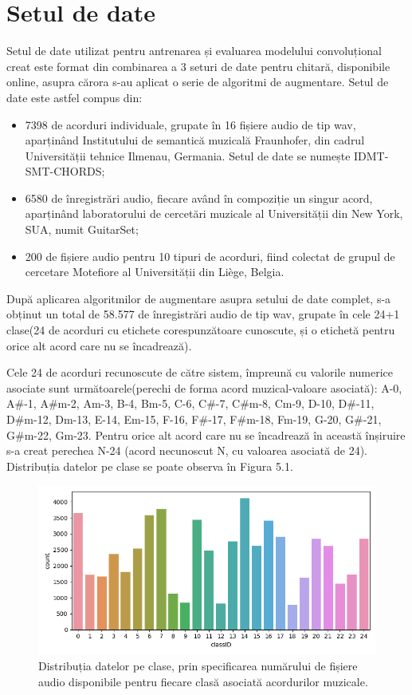 \documentclass[a4paper,12pt]{report}
\begin{document}
\section{Setul de date}
Setul de date utilizat pentru antrenarea și evaluarea modelului convoluțional
creat este format din combinarea a 3 seturi de date pentru chitară,
disponibile online, asupra cărora s-au aplicat o serie de algoritmi de augmentare. 
Setul de date este astfel compus din:
\begin{itemize}
    \item 7398 de acorduri individuale, grupate în 16 fișiere audio de tip wav, aparținând 
Institutului de semantică muzicală Fraunhofer, din cadrul Universității tehnice Ilmenau, Germania. 
Setul de date se numește IDMT-SMT-CHORDS;
    \item 6580 de înregistrări audio, fiecare având în compoziție un singur acord, aparținând 
laboratorului de cercetări muzicale al Universității din New York, SUA, numit
GuitarSet\cite{Guitar-Set};
    \item 200 de fișiere audio pentru 10 tipuri de acorduri, fiind colectat de grupul 
de cercetare Motefiore al Universității din Liège, Belgia.
\end{itemize}

După aplicarea algoritmilor de augmentare asupra setului de date complet, s-a obținut 
un total de 58.577 de înregistrări audio de tip wav, grupate în cele 24+1 clase(24 de acorduri 
cu etichete corespunzătoare cunoscute, și o etichetă pentru orice alt acord care 
nu se încadrează).

Cele 24 de acorduri recunoscute de către sistem, împreună cu valorile numerice asociate sunt
următoarele(perechi de forma acord muzical-valoare asociată): 
A-0, A\#-1, A\#m-2, Am-3, B-4, Bm-5, C-6, C\#-7, C\#m-8, Cm-9, D-10, D\#-11, D\#m-12, Dm-13,
E-14, Em-15, F-16, F\#-17, F\#m-18, Fm-19, G-20, G\#-21, G\#m-22, Gm-23. Pentru orice alt acord 
care nu se încadrează în această înșiruire s-a creat perechea N-24 (acord necunoscut N, cu
valoarea asociată de 24). Distribuția datelor pe clase se poate observa în Figura 5.1.

\begin{figure}[h!]
    \centering
    \includegraphics[width=14cm]{..//resources//images//myplot_new_distribution.png}
    \caption{Distribuția datelor pe clase, prin specificarea numărului de fișiere audio 
    disponibile pentru fiecare clasă asociată acordurilor muzicale.}
\end{figure}
\end{document}
